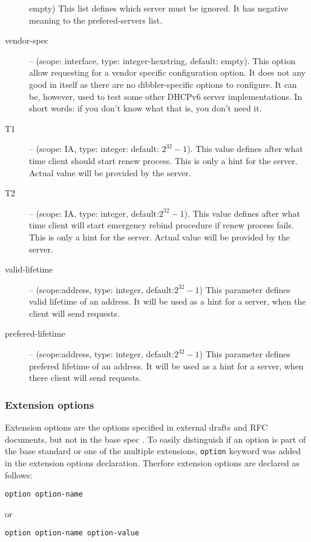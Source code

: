 \begin{description}
	    empty) This list defines which server must be ignored. It
	    has negative meaning to the prefered-servers list.
 \item[vendor-spec] -- (scope: interface, type: integer-hexstring,
	    default: empty). This option allow requesting for a vendor
	    specific configuration option. It does not any good in
	    itself as there are no dibbler-specific options to
	    configure. It can be, however, used to test some other
	    DHCPv6 server implementations. In short words: if you don't
	    know what that is, you don't need it.
 \item[T1] -- (scope: IA, type: integer: default: $2^{32}-1$). This value
	    defines after what time client should start renew
	    process. This is only a hint for the server. Actual value
	    will be provided by the server.
 \item[T2] -- (scope: IA, type: integer, default:$2^{32}-1$). This value
	    defines after what time client will start emergency rebind
	    procedure if renew process fails. This is only a hint for
	    the server. Actual value will be provided by the server.
 \item[valid-lifetime] -- (scope:address, type: integer,
	    default:$2^{32}-1$) This parameter defines valid lifetime of
	    an address. It will be used as a hint for a server, when the
	    client will send requests.
 \item[prefered-lifetime] -- (scope:address, type: integer,
	    default:$2^{32}-1$) This parameter defines prefered lifetime
	    of an address. It will be used as a hint for a server, when
	    there client will send requests.
\end{description}

\subsubsection{Extension options}
Extension options are the options specified in external drafts and RFC
documents, but not in the base spec \cite{rfc3315}. To easily
distinguish if an option is part of the base standard or one of the
multiple extensions, \verb+option+ keyword was added in the extension
options declaration. Therfore extension options are declared as follows:

\begin{verbatim}
option option-name
\end{verbatim}

or

\begin{verbatim}
option option-name option-value
\end{verbatim}

